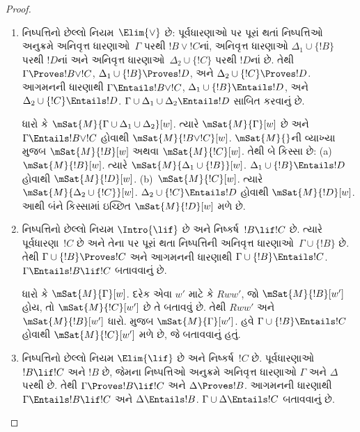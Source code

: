\begin{proof}
\begin{enumerate}
  \item નિષ્પત્તિનો છેલ્લો નિયમ~$\Elim{\lor}$ છે:
    પૂર્વધારણાઓ પર પૂરાં થતાં
      નિષ્પત્તિઓ અનુક્રમે અનિવૃત્ત ધારણાઓ~$\Gamma$
      પરથી $!B \lor !C$નાં, અનિવૃત્ત ધારણાઓ
      $\Delta_1 \cup \{!B\}$ પરથી $!D$નાં અને
      અનિવૃત્ત ધારણાઓ~$\Delta_2 \cup \{!C\}$
      પરથી $!D$નાં છે. તેથી $\Gamma \Proves !B \lor !C$,
      $\Delta_1 \cup \{!B\} \Proves !D$, અને
      $\Delta_2 \cup \{!C\} \Proves !D$.
      આગમનની ધારણાથી $\Gamma \Entails !B \lor !C$,
      $\Delta_1 \cup \{!B\} \Entails !D$, અને
      $\Delta_2 \cup \{!C\} \Entails !D$.
      $\Gamma \cup \Delta_1 \cup \Delta_2 \Entails !D$
      સાબિત કરવાનું છે.

    ધારો કે $\mSat{M}{\Gamma \cup \Delta_1 \cup \Delta_2}[w]$.
    ત્યારે $\mSat{M}{\Gamma}[w]$ છે અને
    $\Gamma \Entails !B \lor !C$ હોવાથી
    $\mSat{M}{!B \lor !C}[w]$. $\mSat{M}{}$ની
    વ્યાખ્યા મુજબ $\mSat{M}{!B}[w]$ અથવા
    $\mSat{M}{!C}[w]$. તેથી બે કિસ્સા છે:
    (a)~$\mSat{M}{!B}[w]$. ત્યારે
    $\mSat{M}{\Delta_1 \cup \{!B\}}[w]$.
    $\Delta_1 \cup \{!B\} \Entails !D$ હોવાથી
    $\mSat{M}{!D}[w]$. (b)~$\mSat{M}{!C}[w]$.
    ત્યારે $\mSat{M}{\Delta_2 \cup \{!C\}}[w]$.
    $\Delta_2 \cup \{!C\} \Entails !D$ હોવાથી
    $\mSat{M}{!D}[w]$. આથી બંને કિસ્સામાં ઇચ્છિત
    $\mSat{M}{!D}[w]$ મળે છે.

  \item નિષ્પત્તિનો છેલ્લો નિયમ $\Intro{\lif}$ છે અને
    નિષ્કર્ષ~$!B\lif !C$ છે. ત્યારે પૂર્વધારણા~$!C$
    છે અને તેના પર પૂરાં થતા નિષ્પત્તિની
    અનિવૃત્ત ધારણાઓ~$\Gamma \cup \{!B\}$ છે.
    તેથી $\Gamma \cup \{!B\} \Proves !C$ અને આગમનની
    ધારણાથી $\Gamma \cup \{!B\} \Entails !C$.
    $\Gamma \Entails !B \lif !C$ બતાવવાનું છે.

    ધારો કે $\mSat{M}{\Gamma}[w]$. દરેક એવા $w'$ માટે
    કે $Rww'$, જો $\mSat{M}{!B}[w']$ હોય, તો
    $\mSat{M}{!C}[w']$ છે તે બતાવવું છે. તેથી
    $Rww'$ અને $\mSat{M}{!B}[w']$ ધારો.
     મુજબ
    $\mSat{M}{\Gamma}[w']$. હવે
    $\Gamma \cup \{!B\} \Entails !C$ હોવાથી
    $\mSat{M}{!C}[w']$ મળે છે, જે બતાવવાનું હતું.

  \item નિષ્પત્તિનો છેલ્લો નિયમ $\Elim{\lif}$ છે અને
    નિષ્કર્ષ~$!C$ છે. પૂર્વધારણાઓ $!B \lif !C$ અને
    $!B$ છે, જેમના નિષ્પત્તિઓ અનુક્રમે
    અનિવૃત્ત ધારણાઓ $\Gamma$ અને $\Delta$
    પરથી છે. તેથી $\Gamma \Proves !B \lif !C$ અને
    $\Delta \Proves !B$. આગમનની ધારણાથી
    $\Gamma \Entails !B \lif !C$ અને
    $\Delta \Entails !B$. $\Gamma \cup \Delta
    \Entails !C$ બતાવવાનું છે.


\end{enumerate}
\end{proof}
